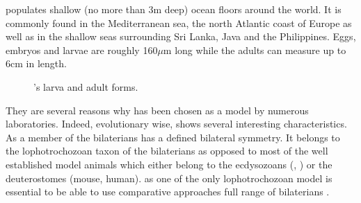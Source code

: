      \platy{} populates shallow (no more than 3m deep) ocean floors around the world. It is commonly found in the Mediterranean sea, the north Atlantic coast of Europe as well as in the shallow seas surrounding Sri Lanka, Java and the Philippines. Eggs, embryos and larvae are roughly 160$\mu$m long while the adults can measure up to 6cm in length.
     
     
\begin{figure}[bth]
        \myfloatalign
         \quad
        \caption{\platyfull{}'s larva and adult forms.}\label{fig:platynereis}
\end{figure}
     
     They are several reasons why \platy{} has been chosen as a model by numerous laboratories. Indeed, evolutionary wise, \platy{} shows several interesting characteristics.  As a member of the bilaterians \platy{} has a defined bilateral symmetry. It belongs to the lophotrochozoan taxon of the bilaterians as opposed to most of the well established model animals which either belong to the ecdysozoans (, ) or the deuterostomes (mouse, human). \platy{} as one of the only lophotrochozoan model is essential to be able to use comparative approaches full range of bilaterians \cite{Fischer10}.\\
     
